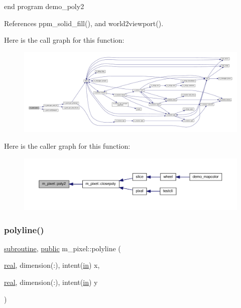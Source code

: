 end program demo\+\_\+poly2 

References ppm\+\_\+solid\+\_\+fill(), and world2viewport().

Here is the call graph for this function\+:
\nopagebreak
\begin{figure}[H]
\begin{center}
\leavevmode
\includegraphics[width=350pt]{namespacem__pixel_a996117d631dce0e92056a0c486be5109_cgraph}
\end{center}
\end{figure}
Here is the caller graph for this function\+:
\nopagebreak
\begin{figure}[H]
\begin{center}
\leavevmode
\includegraphics[width=350pt]{namespacem__pixel_a996117d631dce0e92056a0c486be5109_icgraph}
\end{center}
\end{figure}
\mbox{\label{namespacem__pixel_a067e896f50047694a52c30cffa6f502f}} 
\subsubsection{\texorpdfstring{polyline()}{polyline()}}
{\footnotesize\ttfamily \hyperlink{M__stopwatch_83_8txt_acfbcff50169d691ff02d4a123ed70482}{subroutine}, \hyperlink{M__stopwatch_83_8txt_a2f74811300c361e53b430611a7d1769f}{public} m\+\_\+pixel\+::polyline (\begin{DoxyParamCaption}\item[{\hyperlink{read__watch_83_8txt_abdb62bde002f38ef75f810d3a905a823}{real}, dimension(\+:), intent(\hyperlink{M__journal_83_8txt_afce72651d1eed785a2132bee863b2f38}{in})}]{x,  }\item[{\hyperlink{read__watch_83_8txt_abdb62bde002f38ef75f810d3a905a823}{real}, dimension(\+:), intent(\hyperlink{M__journal_83_8txt_afce72651d1eed785a2132bee863b2f38}{in})}]{y }\end{DoxyParamCaption})}




